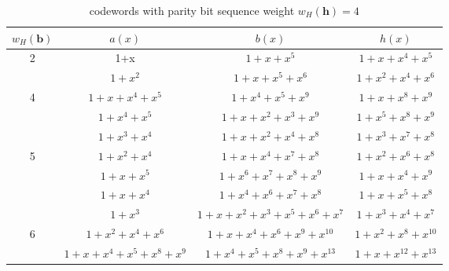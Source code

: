 \documentclass[11pt, oneside, dvipdfmx]{book}
\begin{document}
 \begin{table*}[h]
 
 \caption{codewords with parity bit sequence weight $w_H(\textbf{h})=4$}
\centering
\begin{tabularx}{\linewidth}{c c c c}

 \hline
 $w_H(\textbf{b})$ & $a(x)$ & $b(x)$ & $h(x)$ \\ [0.5ex] 
 \hline\hline
 2 & 1+x & $1+x+x^5$ & $1+x+x^4+x^5$\\ 
 \hline\hline
  & $1+x^2$ & $1+x+x^5+x^6$ & $1+x^2+x^4+x^6$ \\
 
 4 & $1+x+x^4+x^5$& $1+x^4+x^5+x^9$ & $1+x+x^8+x^{9}$ \\
 \hline\hline
 & $1+x^4+x^5$ & $1+x+x^2+x^3+x^{9}$& $1+x^5+x^8+x^{9}$ \\

 & $1+x^3+x^4$ & $1+x+x^2+x^4+x^8$ & $1+x^3+x^7+x^{8}$ \\
 
5 & $1+x^2+x^4$ & $1+x+x^4+x^7+x^8$ & $1+x^2+x^6+x^{8}$\\ 
 
 & $1+x+x^5$ & $1+x^6+x^7+x^8+x^9$ & $1+x+x^4+x^{9}$ \\ 
 
 & $1+x+x^4$ & $1+x^4+x^6+x^7+x^8$ & $1+x+x^5+x^{8}$ \\ 
\hline\hline
 & $1+x^3$ & $1+x+x^2+x^3+x^5+x^6+x^7$ & $1+x^{3}+x^{4}+x^{7}$ \\ 

6 & $1+x^2+x^4+x^6$ & $1+x+x^4+x^6+x^9+x^{10}$ & $1+x^{2}+x^{8}+x^{10}$ \\ 

 & $1+x+x^4+x^5+x^8+x^9$ & $1+x^4+x^5+x^8+x^9+x^{13}$ & $1+x+x^{12}+x^{13}$ \\ [1ex] 

 \hline
 \end{tabularx}
 \label{tab1}
\end{table*}
\end{document}
